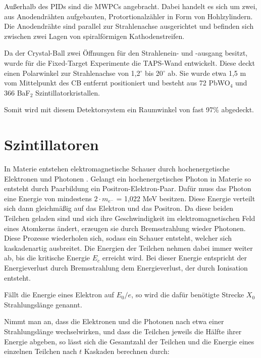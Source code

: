 \documentclass[a4paper,11pt,oneside,final,german,openbib,pdftex]{scrbook}
\begin{document}
{Au{\ss}erhalb des PIDs sind die MWPCs angebracht. Dabei handelt es sich um zwei, aus Anodendr\"ahten aufgebauten, Protortionalz\"ahler in Form von Hohlzylindern. Die Anodendr\"ahte sind parallel zur Strahlenachse ausgerichtet und befinden sich zwischen zwei Lagen von spiralf\"ormigen Kathodenstreifen. 

Da der Crystal-Ball zwei \"Offnungen f\"ur den Strahlenein- und -ausgang besitzt, wurde f\"ur die Fixed-Target Experimente die TAPS-Wand entwickelt.
Diese deckt einen Polarwinkel zur Strahlenachse von 1,2$^{\circ}$ bis 20$^{\circ}$ ab. Sie wurde etwa 1,5 m vom Mittelpunkt des CB entfernt positioniert und besteht aus 72 PbWO$_4$ und 366 BaF$_2$ Szintillatorkristallen. 

Somit wird mit diesem Detektorsystem ein Raumwinkel von fast 97\% abgedeckt.

\section{Szintillatoren}
\label{sec:Szintillatoren}

In Materie entstehen elektromagnetische Schauer durch hochenergetische Elektronen und Photonen \cite{Leo87}.
Gelangt ein hochenergetisches Photon in Materie so entsteht durch Paarbildung ein Positron-Elektron-Paar. Dafür muss das Photon eine Energie von mindestens $2\cdot m_{e^-}$ = 1,022 MeV besitzen. Diese Energie verteilt sich dann gleichmäßig auf das Elektron und das Positron. Da diese beiden Teilchen geladen sind und sich ihre Geschwindigkeit im elektromagnetischen Feld eines Atomkerns ändert, erzeugen sie durch Bremsstrahlung wieder Photonen. Diese Prozesse wiederholen sich, sodass ein Schauer entsteht, welcher sich kaskadenartig ausbreitet. Die Energien der Teilchen nehmen dabei immer weiter ab, bis die kritische Energie $E_c$ erreicht wird. Bei dieser Energie entspricht der Energieverlust durch Bremsstrahlung dem Energieverlust, der durch Ionisation entsteht.

Fällt die Energie eines Elektron auf $E_0/e$, so wird die dafür benötigte Strecke $X_0$ Strahlungslänge genannt.
\newline

Nimmt man an, dass die Elektronen und die Photonen nach etwa einer Strahlungslänge wechselwirken, und dass die Teilchen jeweils die Hälfte ihrer Energie abgeben, so lässt sich die Gesamtzahl der Teilchen und die Energie eines einzelnen Teilchen nach $t$ Kaskaden berechnen durch\cite{Leo87}:

}
\end{document}

